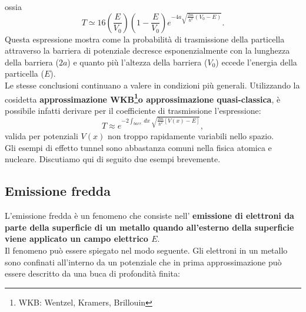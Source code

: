 \documentclass[a4paper,12pt,twoside]{book}
\begin{document}
ossia
\begin{equation}
T \simeq 16 \left(\frac{E}{V_0} \right) \left(1-\frac{E}{V_0}\right) e^{-4a\sqrt{\frac{2m}{\hbar ^2}\left(V_0-E\right)}}.
\end{equation}
Questa espressione mostra come la probabilità di trasmissione della particella attraverso la barriera di potenziale decresce esponenzialmente con la lunghezza della barriera ($2a$) e quanto più l'altezza della barriera ($V_0$) eccede l'energia della particella ($E$).\\
Le stesse conclusioni continuano a valere in condizioni più generali. Utilizzando la cosidetta \textbf{approssimazione WKB\footnote{WKB: Wentzel, Kramers, Brillouin}o approssimazione quasi-classica}, è possibile infatti derivare per il coefficiente di trasmissione l'espressione:
\begin{equation}
T \approx e^{-2 \int_{barr.} dx\ \sqrt{\frac{2m}{\hbar ^2}\left[ V(x)-E \right]}},
\end{equation}
valida per potenziali $V(x)$ non troppo rapidamente variabili nello spazio.\\
Gli esempi di effetto tunnel sono abbastanza comuni nella fisica atomica e nucleare. Discutiamo qui di seguito due esempi brevemente.
\subsection{Emissione fredda}
L'emissione fredda è un fenomeno che consiste nell' \textbf{emissione di elettroni da parte della superficie di un metallo quando all'esterno della superficie viene applicato un campo elettrico $E$}.\\
Il fenomeno può essere spiegato nel modo seguente. Gli elettroni in un metallo sono confinati all'interno da un potenziale che in prima approssimazione può essere descritto da una buca di profondità finita:
\end{document}
